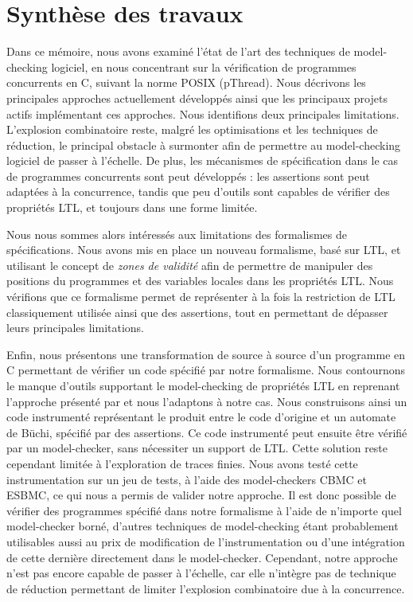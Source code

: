 \label{sec:Conclusion}

\section{Synthèse des travaux}

Dans ce mémoire, nous avons examiné l'état de l'art des techniques de
model-checking logiciel, en nous concentrant sur la vérification de programmes
concurrents en C, suivant la norme POSIX (pThread). Nous décrivons les
principales approches actuellement développés ainsi que les principaux projets
actifs implémentant ces approches. Nous identifions deux principales
limitations. L'explosion combinatoire reste, malgré les optimisations et les
techniques de réduction, le principal obstacle à surmonter afin de permettre au
model-checking logiciel de passer à l'échelle. De plus, les mécanismes de
spécification dans le cas de programmes concurrents sont peut développés : les
assertions sont peut adaptées à la concurrence, tandis que peu d'outils sont
capables de vérifier des propriétés \ac{LTL}, et toujours dans une forme
limitée.

Nous nous sommes alors intéressés aux limitations des formalismes de
spécifications. Nous avons mis en place un nouveau formalisme, basé sur
\ac{LTL}, et utilisant le concept de \emph{zones de validité} afin de permettre
de manipuler des positions du programmes et des variables locales dans les
propriétés \ac{LTL}. Nous vérifions que ce formalisme permet de représenter à la
fois la restriction de \ac{LTL} classiquement utilisée ainsi que des assertions,
tout en permettant de dépasser leurs principales limitations.

Enfin, nous présentons une transformation de source à source d'un programme en C
permettant de vérifier un code spécifié par notre formalisme. Nous contournons
le manque d'outils supportant le model-checking de propriétés LTL en reprenant
l'approche présenté par \cite{morse_ltl} et nous l'adaptons à notre cas. Nous
construisons ainsi un code instrumenté représentant le produit entre le code
d'origine et un automate de Büchi, spécifié par des assertions. Ce code
instrumenté peut ensuite être vérifié par un model-checker, sans nécessiter un
support de LTL. Cette solution reste cependant limitée à l'exploration de traces
finies. Nous avons testé cette instrumentation sur un jeu de tests, à l'aide des
model-checkers CBMC et ESBMC, ce qui nous a permis de valider notre approche. Il
est donc possible de vérifier des programmes spécifié dans notre formalisme à
l'aide de n'importe quel model-checker borné, d'autres techniques de
model-checking étant probablement utilisables aussi au prix de modification de
l'instrumentation ou d'une intégration de cette dernière directement dans le
model-checker. Cependant, notre approche n'est pas encore capable de passer à
l'échelle, car elle n'intègre pas de technique de réduction permettant de
limiter l'explosion combinatoire due à la concurrence.

